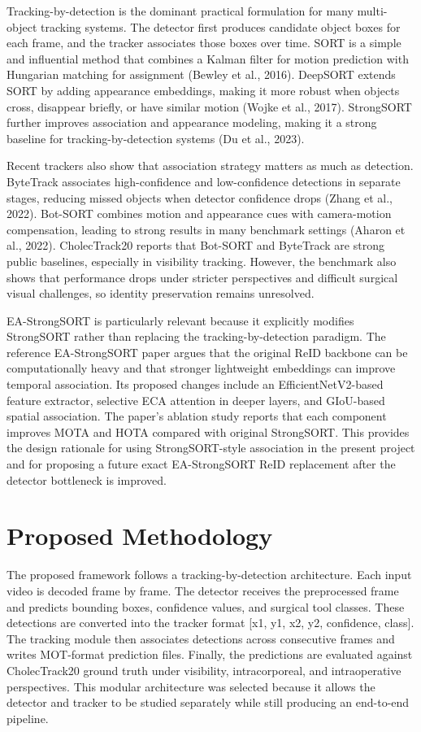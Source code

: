 \documentclass[12pt,a4paper]{article}
\begin{document}
Tracking-by-detection is the dominant practical formulation for many multi-object tracking systems. The detector first produces candidate object boxes for each frame, and the tracker associates those boxes over time. SORT is a simple and influential method that combines a Kalman filter for motion prediction with Hungarian matching for assignment (Bewley et al., 2016). DeepSORT extends SORT by adding appearance embeddings, making it more robust when objects cross, disappear briefly, or have similar motion (Wojke et al., 2017). StrongSORT further improves association and appearance modeling, making it a strong baseline for tracking-by-detection systems (Du et al., 2023).

Recent trackers also show that association strategy matters as much as detection. ByteTrack associates high-confidence and low-confidence detections in separate stages, reducing missed objects when detector confidence drops (Zhang et al., 2022). Bot-SORT combines motion and appearance cues with camera-motion compensation, leading to strong results in many benchmark settings (Aharon et al., 2022). CholecTrack20 reports that Bot-SORT and ByteTrack are strong public baselines, especially in visibility tracking. However, the benchmark also shows that performance drops under stricter perspectives and difficult surgical visual challenges, so identity preservation remains unresolved.

EA-StrongSORT is particularly relevant because it explicitly modifies StrongSORT rather than replacing the tracking-by-detection paradigm. The reference EA-StrongSORT paper argues that the original ReID backbone can be computationally heavy and that stronger lightweight embeddings can improve temporal association. Its proposed changes include an EfficientNetV2-based feature extractor, selective ECA attention in deeper layers, and GIoU-based spatial association. The paper's ablation study reports that each component improves MOTA and HOTA compared with original StrongSORT. This provides the design rationale for using StrongSORT-style association in the present project and for proposing a future exact EA-StrongSORT ReID replacement after the detector bottleneck is improved.

\section{Proposed Methodology}

The proposed framework follows a tracking-by-detection architecture. Each input video is decoded frame by frame. The detector receives the preprocessed frame and predicts bounding boxes, confidence values, and surgical tool classes. These detections are converted into the tracker format [x1, y1, x2, y2, confidence, class]. The tracking module then associates detections across consecutive frames and writes MOT-format prediction files. Finally, the predictions are evaluated against CholecTrack20 ground truth under visibility, intracorporeal, and intraoperative perspectives. This modular architecture was selected because it allows the detector and tracker to be studied separately while still producing an end-to-end pipeline.
\end{document}

